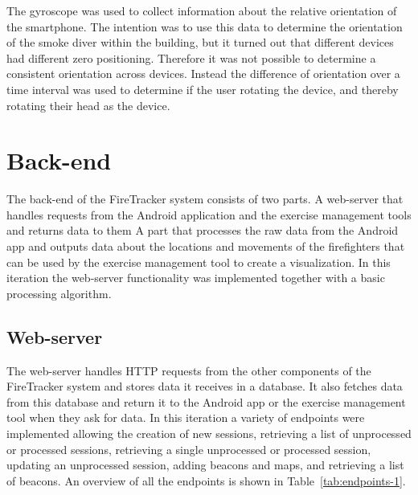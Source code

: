 \documentclass[../Main/thesis.tex]{subfiles}
\begin{document}
The gyroscope was used to collect information about the relative orientation of the smartphone. 
The intention was to use this data to determine the orientation of the smoke diver within the building, but it turned out that different devices had different zero positioning.
Therefore it was not possible to determine a consistent orientation across devices.
Instead the difference of orientation over a time interval was used to determine if the user rotating the device, and thereby rotating their head as the device. 

\section{Back-end}
The back-end of the FireTracker system consists of two parts.
A web-server that handles requests from the Android application and the exercise management tools and returns data to them
A part that processes the raw data from the Android app and outputs data about the locations and movements of the firefighters that can be used by the exercise management tool to create a visualization.
In this iteration the web-server functionality was implemented together with a basic processing algorithm.

\subsection{Web-server}
The web-server handles HTTP requests from the other components of the FireTracker system and stores data it receives in a database. 
It also fetches data from this database and return it to the Android app or the exercise management tool when they ask for data.
In this iteration a variety of endpoints were implemented allowing the creation of new sessions, retrieving a list of unprocessed or processed sessions, retrieving a single unprocessed or processed session, updating an unprocessed session, adding beacons and maps, and retrieving a list of beacons. 
An overview of all the endpoints is shown in Table~\ref{tab:endpoints-1}.
\end{document}
